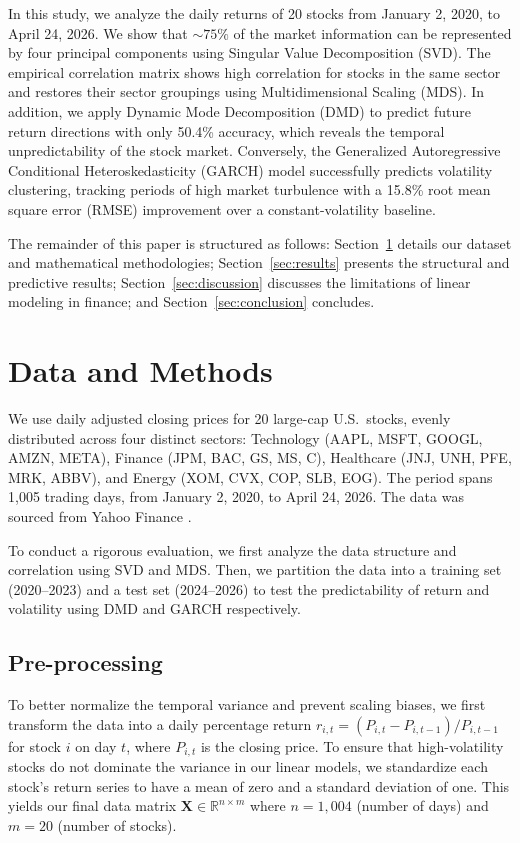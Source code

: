 \documentclass[runningheads]{llncs}
\begin{document}
In this study, we analyze the daily returns of 20 stocks from January 2, 2020, to April 24, 2026. We show that $\sim 75\%$ of the market information can be represented by four principal components using Singular Value Decomposition (SVD). The empirical correlation matrix shows high correlation for stocks in the same sector and restores their sector groupings using Multidimensional Scaling (MDS).
In addition, we apply Dynamic Mode Decomposition (DMD) to predict future return directions with only 50.4\% accuracy, which reveals the temporal unpredictability of the stock market. Conversely, the Generalized Autoregressive Conditional Heteroskedasticity (GARCH) model successfully predicts volatility clustering, tracking periods of high market turbulence with a 15.8\% root mean square error (RMSE) improvement over a constant-volatility baseline.

The remainder of this paper is structured as follows: Section~\ref{sec:methods} details our dataset and mathematical methodologies; Section~\ref{sec:results} presents the structural and predictive results; Section~\ref{sec:discussion} discusses the limitations of linear modeling in finance; and Section~\ref{sec:conclusion} concludes.

\section{Data and Methods}
\label{sec:methods}

We use daily adjusted closing prices for 20 large-cap U.S.\ stocks, evenly distributed across four distinct sectors: Technology (AAPL, MSFT, GOOGL, AMZN, META), Finance (JPM, BAC, GS, MS, C), Healthcare (JNJ, UNH, PFE, MRK, ABBV), and Energy (XOM, CVX, COP, SLB, EOG). The period spans 1,005 trading days, from January 2, 2020, to April 24, 2026. The data was sourced from Yahoo Finance \citep{yahoo_finance}.

To conduct a rigorous evaluation, we first analyze the data structure and correlation using SVD and MDS.
Then, we partition the data into a training set (2020--2023) and a test set (2024--2026) to test the predictability of return and volatility using DMD and GARCH respectively.

\subsection{Pre-processing}
To better normalize the temporal variance and prevent scaling biases, we first transform the data into a daily percentage return $r_{i,t} = (P_{i,t} - P_{i,t-1})/P_{i,t-1}$ for stock $i$ on day $t$, where $P_{i,t}$ is the closing price.
To ensure that high-volatility stocks do not dominate the variance in our linear models, we standardize each stock's return series to have a mean of zero and a standard deviation of one. This yields our final data matrix $\mathbf{X} \in \mathbb{R}^{n \times m}$ where $n = 1{,}004$ (number of days) and $m = 20$ (number of stocks).
\end{document}
